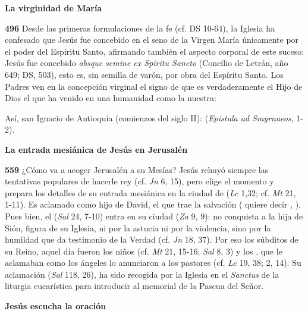 \textbf{La virginidad de María}

\textbf{496} Desde las primeras formulaciones de la fe (cf. DS 10-64), la Iglesia ha confesado que Jesús fue concebido en el seno de la Virgen María únicamente por el poder del Espíritu Santo, afirmando también el aspecto corporal de este suceso: Jesús fue concebido \emph{absque semine ex Spiritu Sancto} (Concilio de Letrán, año 649; DS, 503), esto es, sin semilla de varón, por obra del Espíritu Santo. Los Padres ven en la concepción virginal el signo de que es verdaderamente el Hijo de Dios el que ha venido en una humanidad como la nuestra:

Así, san Ignacio de Antioquía (comienzos del siglo II):  (\emph{Epistula ad Smyrnaeos}, 1-2).

\textbf{La entrada mesiánica de Jesús en Jerusalén}

\textbf{559} ¿Cómo va a acoger Jerusalén a su Mesías? Jesús rehuyó siempre las tentativas populares de hacerle rey (cf. \emph{Jn} 6, 15), pero elige el momento y prepara los detalles de su entrada mesiánica en la ciudad de  (\emph{Lc} 1,32; cf. \emph{Mt} 21, 1-11). Es aclamado como hijo de David, el que trae la salvación ( quiere decir , ). Pues bien, el  (\emph{Sal} 24, 7-10) entra en su ciudad  (\emph{Za} 9, 9): no conquista a la hija de Sión, figura de su Iglesia, ni por la astucia ni por la violencia, sino por la humildad que da testimonio de la Verdad (cf. \emph{Jn} 18, 37). Por eso los súbditos de su Reino, aquel día fueron los niños (cf. \emph{Mt} 21, 15-16; \emph{Sal} 8, 3) y los , que le aclamaban como los ángeles lo anunciaron a los pastores (cf. \emph{Lc} 19, 38; 2, 14). Su aclamación  (\emph{Sal} 118, 26), ha sido recogida por la Iglesia en el \emph{Sanctus} de la liturgia eucarística para introducir al memorial de la Pascua del Señor.

\textbf{Jesús escucha la oración}

